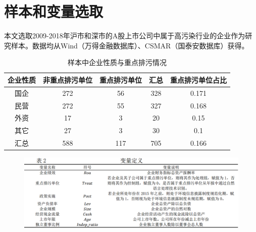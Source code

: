 \documentclass{beamer}	%
\theoremstyle{plain}
\theoremstyle{definition}
\theoremstyle{remark}
\numberwithin{equation}{section}
\begin{document}
\section{样本和变量选取}
\begin{frame}
	本文选取2009-2018年沪市和深市的A股上市公司中属于高污染行业的企业作为研究样本。数据均从Wind（万得金融数据库）、CSMAR（国泰安数据库）获得。
	
\begin{table}[htbp]
	\small
	\label{样本中企业性质与重点排污情况}
	\centering
	\caption{样本中企业性质与重点排污情况}
	\begin{tabular}{ccccc}
		\toprule
		企业性质 & 非重点排污单位 & 重点排污单位 & 汇总  & 重点排污单位占比 \\ \midrule
		 国企  &   272   &   56   & 328 &  0.171   \\
		 民营  &   272   &   55   & 327 &  0.168   \\
		 外资  &   17    &   3    & 20  &   0.15   \\
		 其它  &   27    &   3    & 30  &   0.1    \\
		 汇总  &   588   &  117   & 705 &  0.166   \\ \bottomrule
	\end{tabular}%
\end{table}%
\end{frame}

\begin{frame}
	\begin{figure}
		\centering
		\label{变量定义}
		\includegraphics[scale=0.45]{img/t0.png}
	\end{figure}
\end{frame}
\end{document}
